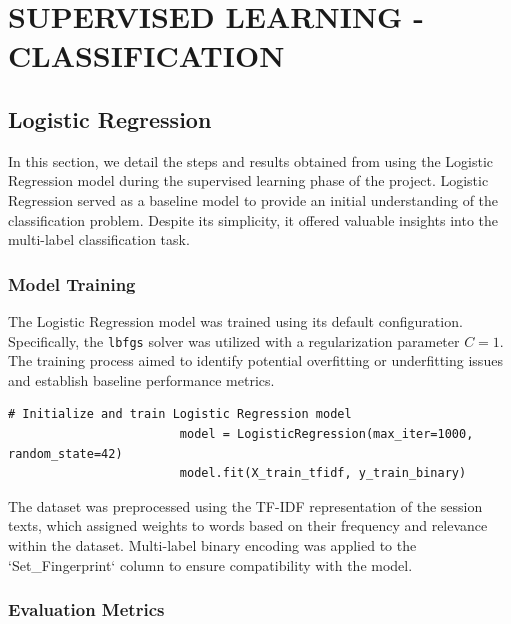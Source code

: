 
\section{SUPERVISED LEARNING - CLASSIFICATION}


    \subsection{Logistic Regression}

        In this section, we detail the steps and results obtained from using the Logistic Regression model during the supervised learning phase of the project. Logistic Regression served as a baseline model to provide an initial understanding of the classification problem. Despite its simplicity, it offered valuable insights into the multi-label classification task.

        \subsubsection{Model Training \\}

            The Logistic Regression model was trained using its default configuration. Specifically, the \texttt{lbfgs} solver was utilized with a regularization parameter \( C = 1 \). The training process aimed to identify potential overfitting or underfitting issues and establish baseline performance metrics.

                \begin{lstlisting}[caption={Train Logistic Regression model}, label={lst:logistic_regression_train}]
                        # Initialize and train Logistic Regression model
                        model = LogisticRegression(max_iter=1000, random_state=42)
                        model.fit(X_train_tfidf, y_train_binary)
                \end{lstlisting}

            The dataset was preprocessed using the TF-IDF representation of the session texts, which assigned weights to words based on their frequency and relevance within the dataset. Multi-label binary encoding was applied to the `Set\_Fingerprint` column to ensure compatibility with the model.

        \subsubsection{Evaluation Metrics \\}

